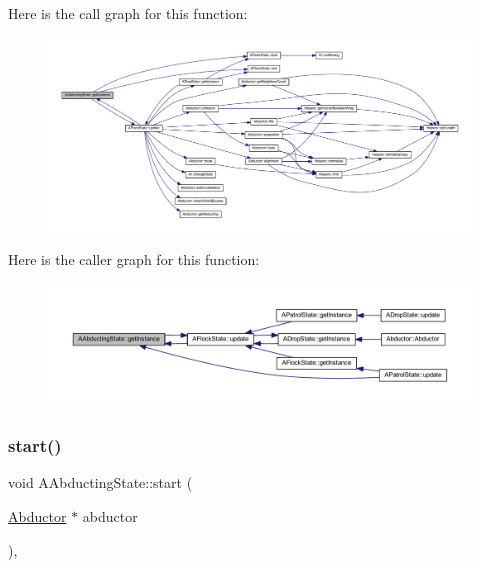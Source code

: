 Here is the call graph for this function\+:
\nopagebreak
\begin{figure}[H]
\begin{center}
\leavevmode
\includegraphics[width=350pt]{class_a_abducting_state_a0843d5645fe863959f454a9497cc32ab_cgraph}
\end{center}
\end{figure}
Here is the caller graph for this function\+:
\nopagebreak
\begin{figure}[H]
\begin{center}
\leavevmode
\includegraphics[width=350pt]{class_a_abducting_state_a0843d5645fe863959f454a9497cc32ab_icgraph}
\end{center}
\end{figure}
\mbox{\label{class_a_abducting_state_a4a592efc0ae90b3c88de9cb676ed8357}} 
\subsubsection{\texorpdfstring{start()}{start()}}
{\footnotesize\ttfamily void A\+Abducting\+State\+::start (\begin{DoxyParamCaption}\item[{\hyperlink{class_abductor}{Abductor} $\ast$}]{abductor }\end{DoxyParamCaption})\hspace{0.3cm}{\ttfamily [override]}, {\ttfamily [virtual]}}



